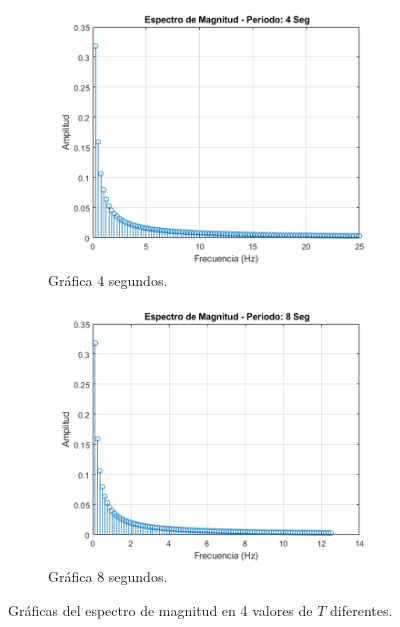\documentclass[8pt]{article}
\begin{document}
\begin{figure}[H]
\begin{subfigure}[h]{0.45\linewidth}
            \includegraphics[width=\linewidth]{img/figure6_C.png}
            \caption{Gráfica 4 segundos.}
            \label{figure6_C}
        \end{subfigure}
        \begin{subfigure}[h]{0.45\linewidth}
            \includegraphics[width=\linewidth]{img/figure6_D.png}
            \caption{Gráfica 8 segundos.}
            \label{figure6_D}
        \end{subfigure}
        \caption{Gráficas del espectro de magnitud en 4 valores de $T$ diferentes.}
        \label{figure6}
    \end{figure}
\end{document}
